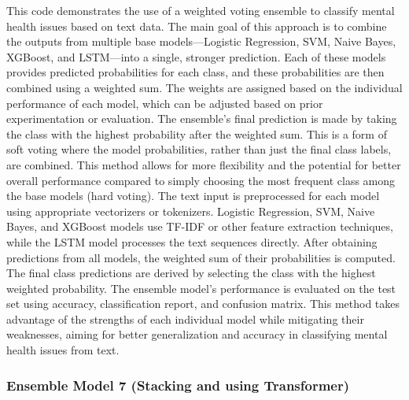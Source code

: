 \noindent
This code demonstrates the use of a weighted voting ensemble to classify mental health issues based on text data. The main goal of this approach is to combine the outputs from multiple base models—Logistic Regression, SVM, Naive Bayes, XGBoost, and LSTM—into a single, stronger prediction. Each of these models provides predicted probabilities for each class, and these probabilities are then combined using a weighted sum. The weights are assigned based on the individual performance of each model, which can be adjusted based on prior experimentation or evaluation. The ensemble's final prediction is made by taking the class with the highest probability after the weighted sum. This is a form of soft voting where the model probabilities, rather than just the final class labels, are combined. This method allows for more flexibility and the potential for better overall performance compared to simply choosing the most frequent class among the base models (hard voting). The text input is preprocessed for each model using appropriate vectorizers or tokenizers. Logistic Regression, SVM, Naive Bayes, and XGBoost models use TF-IDF or other feature extraction techniques, while the LSTM model processes the text sequences directly. After obtaining predictions from all models, the weighted sum of their probabilities is computed. The final class predictions are derived by selecting the class with the highest weighted probability. The ensemble model’s performance is evaluated on the test set using accuracy, classification report, and confusion matrix. This method takes advantage of the strengths of each individual model while mitigating their weaknesses, aiming for better generalization and accuracy in classifying mental health issues from text.


\subsubsection{Ensemble Model 7 (Stacking and using Transformer)}

